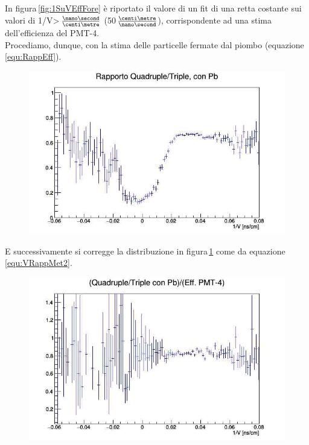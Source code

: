 \documentclass[a4paper,twocolumn]{article}
\begin{document}
In figura\,\ref{fig:1SuVEffFore} è riportato il valore di un fit di una retta costante sui valori di 1/V\:>\,$\frac{\nano\second}{\centi\metre}$ (50\,$\frac{\centi\metre}{\nano\second}$), corrispondente ad una stima dell'efficienza del PMT-4.\\
Procediamo, dunque, con la stima delle particelle fermate dal piombo (equazione\,\ref{equ:RappEff}).

\begin{figure}[H]
\centering
\includegraphics[scale=0.4]{./immagini/TimeOfFlight/1SuVRappPiomboFore.jpg}
\caption{}
\label{fig:1SuVRappPbFore}
\end{figure}

E successivamente si corregge la distribuzione in figura\,\ref{fig:1SuVRappPbFore} come da equazione\,\ref{equ:VRappMet2}.

\begin{figure}[H]
\centering
\includegraphics[scale=0.4]{./immagini/TimeOfFlight/1SuVRappPbEffFore.jpg}
\caption{}
\label{fig:1SuVRappPbEffFore}
\end{figure}
\end{document}
